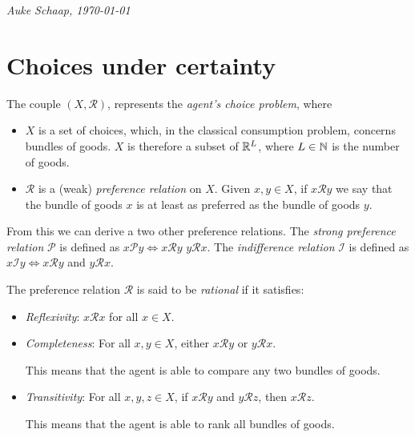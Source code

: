 \documentclass[twoside, titlepage]{article}
\begin{document}
\bigskip
\begin{flushright}
    \textit{Auke Schaap, \today}
\end{flushright}

\vspace*{\fill}
\newpage

\thispagestyle{empty}
\tableofcontents
\clearpage

\section{Choices under certainty}

The couple $(X, \mathcal{R})$, represents the \textit{agent's choice problem}, where
\begin{itemize}
    \item $X$ is a set of choices, which, in the classical consumption problem, concerns bundles of goods. $X$ is therefore a subset of $\mathbb{R}^L$, where $L \in \mathbb{N}$ is the number of goods.
    \item $\mathcal{R}$ is a (weak) \textit{preference relation} on $X$. Given $x,y \in X$, if $x \mathcal{R} y$ we say that the bundle of goods $x$ is at least as preferred as the bundle of goods $y$.
\end{itemize}

From this we can derive a two other preference relations. The \textit{strong preference relation} $\mathcal{P}$ is defined as $x \mathcal{P} y \iff x \mathcal{R} y$  $y \mathcal{R} x$. The \textit{indifference relation} $\mathcal{I}$ is defined as $x \mathcal{I} y \iff x \mathcal{R} y $ and $y \mathcal{R} x$.

\begin{assumption}[Rationality] \label{ass:rationality}
    The preference relation $\mathcal{R}$ is said to be \textit{rational} if it satisfies:
    \begin{itemize}
        \item \textit{Reflexivity}: $x \mathcal{R} x$ for all $x \in X$.
        \item \textit{Completeness}: For all $x, y \in X$, either $x \mathcal{R} y$ or $y \mathcal{R} x$.
        \begin{explanation}
            This means that the agent is able to compare any two bundles of goods.
        \end{explanation}
        \item \textit{Transitivity}: For all $x, y, z \in X$, if $x \mathcal{R} y$ and $y \mathcal{R} z$, then $x \mathcal{R} z$.
        \begin{explanation}
            This means that the agent is able to rank all bundles of goods.
        \end{explanation}
    \end{itemize}
\end{assumption}
\end{document}

